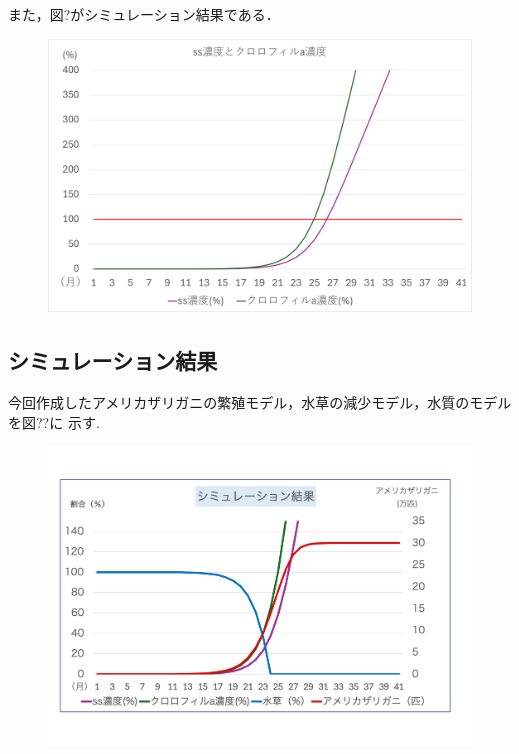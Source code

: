 \documentclass[12pt,a4j,titlepage]{ltjsarticle}
\begin{document}
{{また，図?がシミュレーション結果である．

{\begin{figure}[h]
 \begin{center}
   \includegraphics[width=.95\columnwidth]{SS_Chl_graph.pdf}
 \end{center}
 \end{figure}

\newpage
\subsection{シミュレーション結果}
今回作成したアメリカザリガニの繁殖モデル，水草の減少モデル，水質のモデルを図??に
示す.
{\begin{figure}[h]
 \begin{center}
   \includegraphics[width=.95\columnwidth]{graph6.pdf}
 \end{center}
 \end{figure}
\clearpage
}}}}
\end{document}
